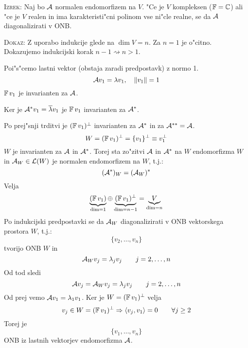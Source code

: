 \textsc{Izrek:} Naj bo $\mathcal{A}$ normalen endomorfizem na $V$. "Ce je $V$ kompleksen ($\operatorname{\mathbb{F}} = \mathbb{C}$) ali "ce je $V$ realen in ima karakteristi"cni polinom vse ni"cle realne, se da $\mathcal{A}$ diagonalizirati v ONB.

\textsc{Dokaz:} Z uporabo indukcije glede na $\dim V = n$. Za $n = 1$ je o"citno. Dokazujemo indukcijski korak $n -1 \rightsquigarrow n > 1$.

Poi"s"cemo lastni vektor (obstaja zaradi predpostavk) z normo 1.
\begin{equation*}
\mathcal{A} v_1 = \lambda v_1 , \quad \| v_1 \| = 1
\end{equation*}
$\operatorname{\mathbb{F}} v_1$ je invarianten za $\mathcal{A}$.

Ker je $\mathcal{A}^* v_1 = \overline{\lambda} v_1$ je $\operatorname{\mathbb{F}} v_1$ invarianten za $\mathcal{A}^*$.

Po prej"snji trditvi je $(\operatorname{\mathbb{F}} v_1)^\perp$ invarianten za $\mathcal{A}^*$ in za $\mathcal{A}^{**} = \mathcal{A}$.
\begin{equation*}
W = (\operatorname{\mathbb{F}} v_1)^\perp = \{ v_1 \}^\perp \equiv v_1^\perp
\end{equation*}
$W$ je invarianten za $\mathcal{A}$ in $\mathcal{A}^*$. Torej sta zo"zitvi $\mathcal{A}$ in $\mathcal{A}^*$ na $W$ endomorfizma $W$ in $\mathcal{A}_W \in \mathcal{L}(W)$ je normalen endomorfizem na $W$, t.j.:
\begin{equation*}
(\mathcal{A}^*)_W = (\mathcal{A}_W)^*
\end{equation*}
Velja
\begin{equation*}
\underbrace{(\operatorname{\mathbb{F}} v_1)}_{\dim = 1} \oplus \underbrace{(\operatorname{\mathbb{F}} v_1)^\perp}_{\dim = n-1} = \underbrace{V}_{\dim = n}
\end{equation*}
Po indukcijski predpostavki se da $\mathcal{A}_W$ diagonalizirati v ONB vektorskega prostora $W$, t.j.:
\begin{equation*}
\{ v_2, \ldots, v_n \}
\end{equation*}
tvorijo ONB $W$ in
\begin{equation*}
\mathcal{A}_W v_j = \lambda_j v_j \qquad j = 2, \ldots, n
\end{equation*}
Od tod sledi
\begin{equation*}
\mathcal{A} v_j = \mathcal{A}_W v_j = \lambda_j v_j \qquad j = 2, \ldots, n
\end{equation*}
Od prej vemo $\mathcal{A} v_1 = \lambda_1 v_1$. Ker je $W = (\operatorname{\mathbb{F}} v_1)^\perp$ velja
\begin{equation*}
v_j \in W = (\operatorname{\mathbb{F}} v_1)^\perp \Rightarrow \langle v_j, v_1 \rangle = 0 \qquad \forall j \geq 2
\end{equation*}
Torej je
\begin{equation*}
\{ v_1, \ldots, v_n \}
\end{equation*}
ONB iz lastnih vektorjev endomorfizma $\mathcal{A}$.

